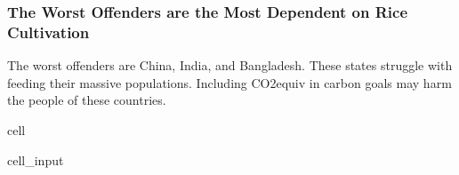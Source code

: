 \documentclass[letterpaper,10pt,english]{jupyterBook}
\begin{document}
\subsubsection{The Worst Offenders are the Most Dependent on Rice Cultivation}
\label{\detokenize{notebooks/full_post:the-worst-offenders-are-the-most-dependent-on-rice-cultivation}}
\sphinxAtStartPar
The worst offenders are China, India, and Bangladesh.  These states struggle with feeding their massive populations.  Including CO2equiv in carbon goals may harm the people of these countries.

\begin{sphinxuseclass}{cell}\begin{sphinxVerbatimInput}

\begin{sphinxuseclass}{cell_input}
\begin{sphinxVerbatim}[commandchars=\\\{\}]
    
  
    
          
                         
 
\end{sphinxVerbatim}


\end{sphinxuseclass}
\end{sphinxVerbatimInput}
\end{sphinxuseclass}
\end{document}
